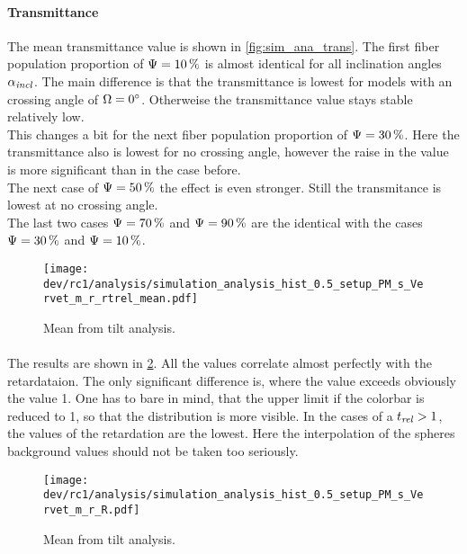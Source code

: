 \paragraph{Transmittance}
The mean transmittance value is shown in \cref{fig:sim_ana_trans}.
The first fiber population proportion of $\textnormal{$\Psi$}=\SI{10}{\percent}$ is almost identical for all inclination angles $\textnormal{$\alpha_{\mathit{incl}}$}$.
The main difference is that the transmittance is lowest for models with an crossing angle of $\textnormal{$\Omega$} = \SI{0}{\degree}$.
Otherweise the transmittance value stays stable relatively low.
\\
% 
This changes a bit for the next fiber population proportion of $\textnormal{$\Psi$}=\SI{30}{\percent}$.
Here the transmittance also is lowest for no crossing angle, however the raise in the value is more significant than in the case before.
\\
The next case of $\textnormal{$\Psi$}=\SI{50}{\percent}$ the effect is even stronger.
Still the transmitance is lowest at no crossing angle.
\\
The last two cases $\textnormal{$\Psi$}=\SI{70}{\percent}$ and $\textnormal{$\Psi$}=\SI{90}{\percent}$ are the identical with the cases $\textnormal{$\Psi$}=\SI{30}{\percent}$ and $\textnormal{$\Psi$}=\SI{10}{\percent}$.
% 
% 
% 
\begin{figure}[!p]
\centering
\texttt{[image: dev/rc1/analysis/simulation\_analysis\_hist\_0.5\_setup\_PM\_s\_Vervet\_m\_r\_rtrel\_mean.pdf]} 
\caption[Simulation \trel{}]{Mean \trel{} from tilt analysis.}
\label{fig:sim_ana_trel}
\end{figure}
% 
\paragraph{\trel}
The \trel{} results are shown in \cref{fig:sim_ana_trel}.
All the values correlate almost perfectly with the retardataion.
The only significant difference is, where the \trel{} value exceeds obviously the value 1.
One has to bare in mind, that the upper limit if the colorbar is reduced to 1, so that the distribution is more visible.
In the cases of a $\textnormal{$t_\mathit{rel}$} > 1$, the values of the retardation are the lowest.
Here the interpolation of the spheres background values should not be taken too seriously.
% 
% 
% 
\begin{figure}[!p]
\centering
\texttt{[image: dev/rc1/analysis/simulation\_analysis\_hist\_0.5\_setup\_PM\_s\_Vervet\_m\_r\_R.pdf]} 
\caption[Simulation \rvalue]{Mean \rvalue{} from tilt analysis.}
\label{fig:sim_ana_trel}
\end{figure}
% 
